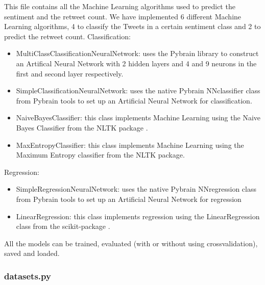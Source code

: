 \documentclass[10pt]{IEEEtran}
\begin{document}
This file contains all the Machine Learning algorithms used to predict the sentiment and the retweet count. We have implemented 6 different Machine Learning algorithms, 4 to classify the Tweets in a certain sentiment class and 2 to predict the retweet count.
Classification:
\begin{itemize}
	\item MultiClassClassificationNeuralNetwork: uses the Pybrain library \cite{pybrain} to construct an Artifical Neural Network with 2 hidden layers and 4 and 9 neurons in the first and second layer respectively. 
	\item SimpleClassificationNeuralNetwork: uses the native Pybrain NNclassifier class from Pybrain tools to set up an Artificial Neural Network for classification. 
	\item NaiveBayesClassifier: this class implements Machine Learning using the Naive Bayes Classifier from the NLTK package \cite{nltk}. 
	\item MaxEntropyClassifier: this class implements Machine Learning using the Maximum Entropy classifier from the NLTK package. 
\end{itemize}

Regression:
\begin{itemize}
	\item SimpleRegressionNeuralNetwork: uses the native Pybrain NNregression class from Pybrain tools to set up an Artificial Neural Network for regression 
	\item LinearRegression: this class implements regression using the LinearRegression class from the scikit-package \cite{sklearn}.
\end{itemize}

All the models can be trained, evaluated (with or without using crossvalidation), saved and loaded.

\subsubsection{datasets.py}
\end{document}
